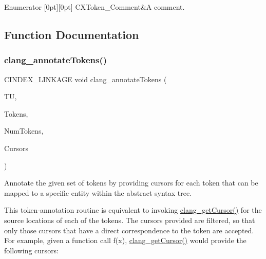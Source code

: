 \begin{DoxyEnumFields}{Enumerator}
[0pt][0pt]{}\mbox{\label{group__CINDEX__LEX_ggaf63e37eee4280e2c039829af24bbc201a6a24a53d8d4a4aa6e4bcb4847c9652f3}} 
C\+X\+Token\+\_\+\+Comment&A comment. \\
\hline

\end{DoxyEnumFields}


\subsection{Function Documentation}
\mbox{\label{group__CINDEX__LEX_gadc0c15904e61902b73e02700af0863a0}} 
\subsubsection{\texorpdfstring{clang\+\_\+annotate\+Tokens()}{clang\_annotateTokens()}}
{\footnotesize\ttfamily C\+I\+N\+D\+E\+X\+\_\+\+L\+I\+N\+K\+A\+GE void clang\+\_\+annotate\+Tokens (\begin{DoxyParamCaption}\item[{\mbox{\hyperlink{group__CINDEX_gacdb7815736ca709ce9a5e1ec2b7e16ac}{C\+X\+Translation\+Unit}}}]{TU,  }\item[{\mbox{\hyperlink{structCXToken}{C\+X\+Token}} $\ast$}]{Tokens,  }\item[{unsigned}]{Num\+Tokens,  }\item[{\mbox{\hyperlink{structCXCursor}{C\+X\+Cursor}} $\ast$}]{Cursors }\end{DoxyParamCaption})}



Annotate the given set of tokens by providing cursors for each token that can be mapped to a specific entity within the abstract syntax tree. 

This token-\/annotation routine is equivalent to invoking \mbox{\hyperlink{group__CINDEX__CURSOR__SOURCE_ga30a9972c7e099ab2735fa6c45e247ec8}{clang\+\_\+get\+Cursor()}} for the source locations of each of the tokens. The cursors provided are filtered, so that only those cursors that have a direct correspondence to the token are accepted. For example, given a function call {\ttfamily f(x)}, \mbox{\hyperlink{group__CINDEX__CURSOR__SOURCE_ga30a9972c7e099ab2735fa6c45e247ec8}{clang\+\_\+get\+Cursor()}} would provide the following cursors\+:


